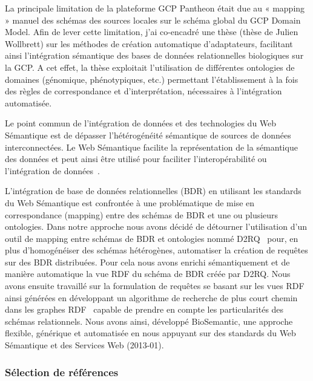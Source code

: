 La principale limitation de la plateforme GCP Pantheon était due au « mapping » manuel des schémas des sources locales sur le schéma global du GCP Domain Model. Afin de lever cette limitation, j’ai co-encadré une thèse (thèse de Julien Wollbrett) sur les méthodes de création automatique d’adaptateurs, facilitant ainsi l’intégration sémantique des bases de données relationnelles biologiques sur la GCP. A cet effet, la thèse exploitait l’utilisation de différentes ontologies de domaines (génomique, phénotypiques, etc.) permettant l’établissement à la fois des règles de correspondance et d’interprétation, nécessaires à l’intégration automatisée. 

Le point commun de l’intégration de données et des technologies du Web Sémantique est de dépasser l’hétérogénéité sémantique de sources de données interconnectées. Le Web Sémantique facilite la représentation de la sémantique des données et peut ainsi être utilisé pour faciliter l’interopérabilité ou l’intégration de données~\cite{antezana2009,Jonquet2010}. %

L'intégration de base de données relationnelles (BDR) en utilisant les standards du Web Sémantique est confrontée à une problématique de mise en correspondance (mapping) entre des schémas de BDR et une ou plusieurs ontologies. Dans notre approche nous avons décidé de détourner l'utilisation d'un outil de mapping entre schémas de BDR et ontologies nommé D2RQ~\cite{Bizer2003,Bizer2004} pour, en plus d'homogénéiser des schémas hétérogènes, automatiser la création de requêtes sur des BDR distribuées. Pour cela nous avons enrichi sémantiquement et de manière automatique la vue RDF du schéma de BDR créée par D2RQ. Nous avons ensuite travaillé sur la formulation de requêtes se basant sur les vues RDF ainsi générées en développant un algorithme de recherche de plus court chemin dans les graphes RDF~\cite{wollbrett2013clever} capable de prendre en compte les particularités des schémas relationnels. Nous avons ainsi, développé BioSemantic, une approche flexible, générique et automatisée en nous appuyant sur des standards du Web Sémantique et des Services Web (2013-01). 

\subsubsection*{Sélection de références}

